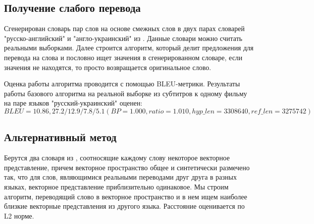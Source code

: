 \documentclass{article}
\begin{document}
 \subsection{Получение слабого перевода}
 Сгенерирован словарь пар слов на основе смежных слов в двух парах словарей "русско-английский" и "англо-украинский" из \cite{conneau2017word}. Данные словари можно считать реальными выборками. Далее строится алгоритм, который делит предложения для перевода на слова и пословно ищет значения в сгенерированном словаре, если значения не находятся, то просто возвращается оригинальное слово. 
 
 Оценка работы алгоритма проводится с помощью BLEU-метрики. Результаты работы базового алгоритма на реальной выборке из субтитров к одному фильму на паре языков "русский-украинский" оценен: $$BLEU = 10.86, 27.2/12.9/7.8/5.1 (BP=1.000, ratio=1.010, hyp\_len=3308640, ref\_len=3275742)$$
 

\subsection{Альтернативный метод}
 Берутся два словаря из \cite{conneau2017word}, соотносящие каждому слову некоторое векторное представление, причем векторное пространство общее и синтетически размечено так, что для слов, являющимися реальными переводами друг друга в разных языках, векторное представление приблизительно одинаковое.  Мы строим алгоритм, переводящий слово в векторное пространство и в нем ищем наиболее близкие векторные представления из другого языка. Расстояние оценивается по L2 норме. 






\end{document}
